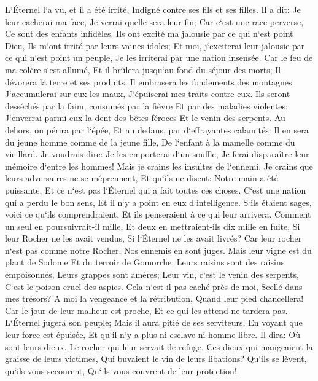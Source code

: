 \verse L`Éternel l`a vu, et il a été irrité, Indigné contre ses fils et ses filles. 
\verse Il a dit: Je leur cacherai ma face, Je verrai quelle sera leur fin; Car c`est une race perverse, Ce sont des enfants infidèles. 
\verse Ils ont excité ma jalousie par ce qui n`est point Dieu, Ils m`ont irrité par leurs vaines idoles; Et moi, j`exciterai leur jalousie par ce qui n`est point un peuple, Je les irriterai par une nation insensée. 
\verse Car le feu de ma colère s`est allumé, Et il brûlera jusqu`au fond du séjour des morts; Il dévorera la terre et ses produits, Il embrasera les fondements des montagnes. 
\verse J`accumulerai sur eux les maux, J`épuiserai mes traits contre eux. 
\verse Ils seront desséchés par la faim, consumés par la fièvre Et par des maladies violentes; J`enverrai parmi eux la dent des bêtes féroces Et le venin des serpents. 
\verse Au dehors, on périra par l`épée, Et au dedans, par d`effrayantes calamités: Il en sera du jeune homme comme de la jeune fille, De l`enfant à la mamelle comme du vieillard. 
\verse Je voudrais dire: Je les emporterai d`un souffle, Je ferai disparaître leur mémoire d`entre les hommes! 
\verse Mais je crains les insultes de l`ennemi, Je crains que leurs adversaires ne se méprennent, Et qu`ils ne disent: Notre main a été puissante, Et ce n`est pas l`Éternel qui a fait toutes ces choses. 
\verse C`est une nation qui a perdu le bon sens, Et il n`y a point en eux d`intelligence. 
\verse S`ils étaient sages, voici ce qu`ils comprendraient, Et ils penseraient à ce qui leur arrivera. 
\verse Comment un seul en poursuivrait-il mille, Et deux en mettraient-ils dix mille en fuite, Si leur Rocher ne les avait vendus, Si l`Éternel ne les avait livrés? 
\verse Car leur rocher n`est pas comme notre Rocher, Nos ennemis en sont juges. 
\verse Mais leur vigne est du plant de Sodome Et du terroir de Gomorrhe; Leurs raisins sont des raisins empoisonnés, Leurs grappes sont amères; 
\verse Leur vin, c`est le venin des serpents, C`est le poison cruel des aspics. 
\verse Cela n`est-il pas caché près de moi, Scellé dans mes trésors? 
\verse A moi la vengeance et la rétribution, Quand leur pied chancellera! Car le jour de leur malheur est proche, Et ce qui les attend ne tardera pas. 
\verse L`Éternel jugera son peuple; Mais il aura pitié de ses serviteurs, En voyant que leur force est épuisée, Et qu`il n`y a plus ni esclave ni homme libre. 
\verse Il dira: Où sont leurs dieux, Le rocher qui leur servait de refuge, 
\verse Ces dieux qui mangeaient la graisse de leurs victimes, Qui buvaient le vin de leurs libations? Qu`ils se lèvent, qu`ils vous secourent, Qu`ils vous couvrent de leur protection! 
